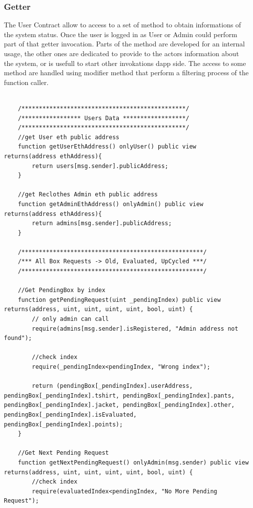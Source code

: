 \subsubsection{Getter}

The User Contract allow to access to a set of method to obtain informations of the system status.
Once the user is logged in as User or Admin could perform part of that getter invocation.
Parts of the method are developed for an internal usage, the other ones are dedicated
to provide to the actors information about the system, or is usefull to start other invokations
dapp side. The access to some method are handled using modifier method that perform a filtering
process of the function caller. 
\bigskip 

\begin{lstlisting}[language=Solidity]
    
    /***********************************************/
    /***************** Users Data ******************/
    /***********************************************/
    //get User eth public address
    function getUserEthAddress() onlyUser() public view returns(address ethAddress){
        return users[msg.sender].publicAddress;
    }

    //get Reclothes Admin eth public address
    function getAdminEthAddress() onlyAdmin() public view returns(address ethAddress){
        return admins[msg.sender].publicAddress;
    }

    /****************************************************/
    /*** All Box Requests -> Old, Evaluated, UpCycled ***/
    /****************************************************/

    //Get PendingBox by index
    function getPendingRequest(uint _pendingIndex) public view returns(address, uint, uint, uint, uint, bool, uint) {
        // only admin can call
        require(admins[msg.sender].isRegistered, "Admin address not found");

        //check index
        require(_pendingIndex<pendingIndex, "Wrong index");

        return (pendingBox[_pendingIndex].userAddress, pendingBox[_pendingIndex].tshirt, pendingBox[_pendingIndex].pants, pendingBox[_pendingIndex].jacket, pendingBox[_pendingIndex].other, pendingBox[_pendingIndex].isEvaluated, pendingBox[_pendingIndex].points);
    }

    //Get Next Pending Request
    function getNextPendingRequest() onlyAdmin(msg.sender) public view returns(address, uint, uint, uint, uint, bool, uint) {
        //check index
        require(evaluatedIndex<pendingIndex, "No More Pending Request");


\end{lstlisting}
